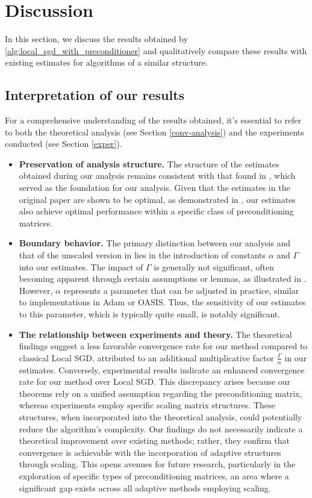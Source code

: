 \documentclass[sn-mathphys,Numbered]{sn-jnl}%
\renewcommand{\|}{\parallel}
\renewcommand {\*} {\ast}
\begin{document}
\section{Discussion}
In this section, we discuss the results obtained by  
\cref{alg:local_sgd_with_preconditioner}
and qualitatively compare these results with existing estimates for 
algorithms of a similar structure.

\subsection{Interpretation of our results}
For a comprehensive understanding of the results obtained, it's essential to refer to both the theoretical analysis (see Section \ref{conv-analysis}) and the experiments conducted (see Section \ref{exper}).
\begin{itemize}
    \item \textbf{Preservation of analysis structure.} 
    The structure of the estimates obtained during our analysis remains consistent with that found in \cite{khaled2020tighter}, which served as the foundation for our analysis. Given that the estimates in the original paper \cite{khaled2020tighter} are shown to be optimal, as demonstrated in  \cite{glasgow2022sharp}, our estimates also achieve optimal performance within a specific class of preconditioning matrices.
    
    
    \item \textbf{Boundary behavior.} 
    The primary distinction between our analysis and that of the unscaled version in \cite{khaled2020tighter} lies in the introduction of constants $\alpha$ and $\Gamma$ into our estimates. The impact of $\Gamma$ is generally not significant, often becoming apparent through certain assumptions or lemmas, as illustrated in  \cite{sadiev2022stochastic}. 
    However, $\alpha$ represents a parameter that can be adjusted in practice, similar to implementations in Adam or OASIS. 
    Thus, the sensitivity of our estimates to this parameter, which is typically quite small, is notably significant.    
     
    \item \textbf{The relationship between  experiments and theory.} 
    The theoretical findings suggest a less favorable convergence rate for our method compared to classical Local SGD, attributed to an additional multiplicative factor $\frac{\Gamma}{\alpha}$ in our estimates. Conversely, experimental results indicate an enhanced convergence rate for our method over Local SGD. This discrepancy arises because our theorems rely on a unified assumption regarding the preconditioning matrix, whereas experiments employ specific scaling matrix structures. These structures, when incorporated into the theoretical analysis, could potentially reduce the algorithm's complexity. Our findings do not necessarily indicate a theoretical improvement over existing methods; rather, they confirm that convergence is achievable with the incorporation of adaptive structures through scaling. This opens avenues for future research, particularly in the exploration of specific types of preconditioning matrices, an area where a significant gap exists across all adaptive methods employing scaling.
    

\end{itemize}
\end{document}
